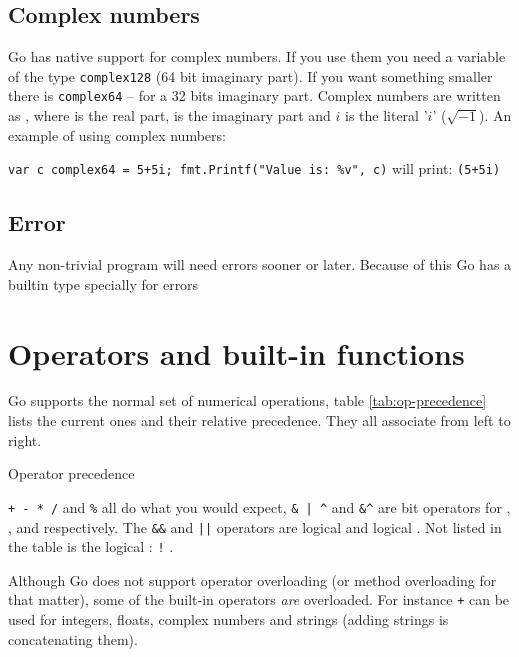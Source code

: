 \subsection{Complex numbers}
Go has native support for complex numbers. If you 
use them you need a variable of the type \lstinline{complex128} (64
bit imaginary part). If you
want something smaller there is \lstinline{complex64} -- for a 32 bits
imaginary part.
Complex numbers are written as
, where  is the real part,
 is the imaginary part and $i$ is the literal '$i$' ($\sqrt{-1}$).
An example of using complex numbers:

\lstinline{var c complex64 = 5+5i; fmt.Printf("Value is: %v", c)}\newline
will print: \lstinline{(5+5i)}

\subsection{Error}
Any non-trivial program will need errors sooner or later. Because of this
Go has a builtin type specially for errors


\section{Operators and built-in functions}
Go supports the normal set of numerical operations,
table \ref{tab:op-precedence}
lists the current ones and their relative precedence. They
all associate from left to right.

\begin{table}[H]
\begin{center}
\caption{Operator precedence}
\label{tab:op-precedence}

\end{center}
\end{table}
\verb|+ - * /| and \verb|%| all do what you would expect,
\verb!& | ^!
and \verb!&^! are bit operators for
, 
,  and  respectively.
The \verb|&&| and \verb/||/ operators are 
logical  and
logical . Not listed in the table
is the logical : \verb/!/ .

Although Go does not support operator overloading (or method
overloading for that matter), some of the built-in
operators \emph{are} overloaded. For instance \texttt{+} can be used for integers,
floats, complex numbers and strings (adding strings is concatenating
them). 

